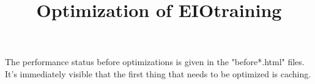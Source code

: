 \documentclass{article}
\begin{document}
\title{Optimization of EIOtraining}
\maketitle

The performance status before optimizations is given in the "before*.html" files. It's immediately visible that the first thing that needs to be optimized is caching.
\end{document}
